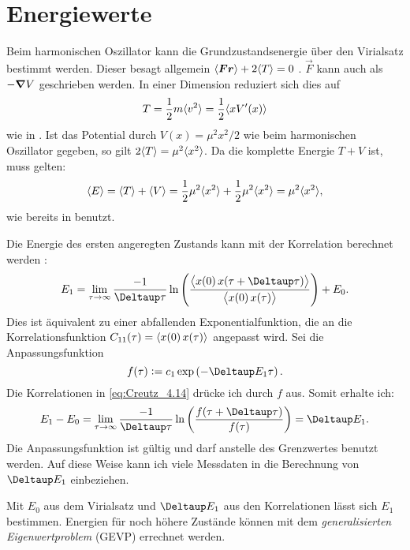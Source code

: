 \chapter{Energiewerte}

Beim harmonischen Oszillator kann die Grundzustandsenergie über den Virialsatz
bestimmt werden. Dieser besagt allgemein $\langle \boldsymbol{F} \boldsymbol{r} \rangle + 2
\langle T \rangle = 0$ \parencite[551]{Kuypers/Mechanik}. $\vec F$ kann auch als $-
\boldsymbol{\nabla} V$ geschrieben werden. In einer Dimension reduziert sich dies auf
\[
    T = \frac12 m \langle v^2 \rangle = \frac12 \langle x V'(x) \rangle
\]
wie in \parencite[(2.29)]{Creutz/Statistical_Approach_QM}.
Ist das Potential durch $V(x) = \mu^2 x^2/2$ wie beim harmonischen Oszillator
gegeben, so gilt $2 \langle T \rangle = \mu^2 \langle x^2 \rangle$. Da die komplette Energie
$T + V$ ist, muss gelten:
\[
    \langle E \rangle = \langle T \rangle + \langle V \rangle
    = \frac12 \mu^2 \langle x^2 \rangle + \frac12 \mu^2 \langle x^2 \rangle
    = \mu^2 \langle x^2 \rangle,
\]
wie bereits in \parencite[(4.13)]{Creutz/Statistical_Approach_QM} benutzt.

Die Energie des ersten angeregten Zustands kann mit der Korrelation
berechnet werden \parencite[(4.14)]{Creutz/Statistical_Approach_QM}:
\begin{equation}
    \label{eq:Creutz_4.14}
    E_1 = \lim_{\tau \to \infty} \frac{-1}{\Deltaup \tau} \ln
    \del{\frac{\Bracket{x(0) \, x(\tau + \Deltaup \tau)}}{\Bracket{x(0) \,
    x(\tau)}}} + E_0.
\end{equation}
Dies ist äquivalent zu einer abfallenden Exponentialfunktion, die an die
Korrelationsfunktion $C_{11}(\tau) = \langle x(0) \, x(\tau) \rangle$ angepasst wird.
Sei die Anpassungsfunktion
\begin{equation}
    \label{eq:fit-function-time-evolution}
    f(\tau) := c_1 \exp\del{-\Deltaup E_1 \tau}.
\end{equation}
Die Korrelationen in \eqref{eq:Creutz_4.14} drücke ich durch $f$ aus. Somit
erhalte ich:
\[
    E_1 - E_0
    = \lim_{\tau \to \infty} \frac{-1}{\Deltaup \tau} \ln
    \del{\frac{f(\tau + \Deltaup \tau)}{f(\tau)}}
    = \Deltaup E_1.
\]
Die Anpassungsfunktion ist gültig und darf anstelle des Grenzwertes benutzt
werden. Auf diese Weise kann ich viele Messdaten in die Berechnung von
$\Deltaup E_1$ einbeziehen.

Mit $E_0$ aus dem Virialsatz und $\Deltaup E_1$ aus den Korrelationen lässt
sich $E_1$ bestimmen. Energien für noch höhere Zustände können mit dem
\emph{generalisierten Eigenwertproblem} (GEVP) errechnet werden.

